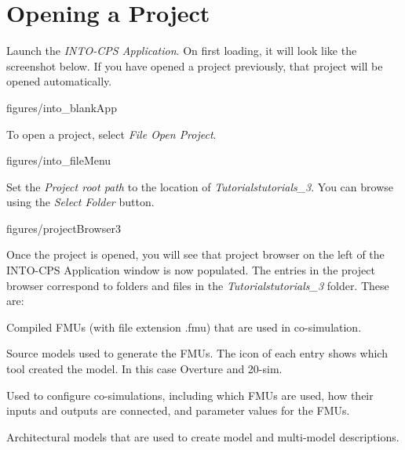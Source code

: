 \documentclass[11pt,a4paper]{../tutorial}
\begin{document}
\section{Opening a Project}
\begin{instructions}
\item Launch the \emph{INTO-CPS Application}. On first loading, it will look like the screenshot below. If you have opened a project previously, that project will be opened automatically.

\begin{annotation}[width=0.85\linewidth,trim=0 150 0 0,clip]{figures/into_blankApp}
    \end{annotation}

\newpage
\item To open a project, select \emph{File \menusep Open Project}.

\begin{annotation}[width=0.85\linewidth,trim=0 260 0 0,clip]{figures/into_fileMenu}
    \end{annotation}

\item Set the \emph{Project root path} to the location of \emph{Tutorials\pathsep{}tutorials\_3}. You can browse using the \emph{Select Folder} button.

\begin{annotation}[width=0.85\linewidth]{figures/projectBrowser3}
\end{annotation}

\newpage
\item Once the project is opened, you will see that project browser on the left of the INTO-CPS Application window is now populated. The entries in the project browser correspond to folders and files in the \emph{Tutorials\pathsep{}tutorials\_3} folder. These are:

    \begin{description}[noitemsep]
        \item[FMUs] Compiled FMUs (with file extension .fmu) that are used in co-simulation.
        \item[Models] Source models used to generate the FMUs. The icon of each entry shows which tool created the model. In this case Overture and 20-sim.
        \item[Multi-models] Used to configure co-simulations, including which FMUs are used, how their inputs and outputs are connected, and parameter values for the FMUs.
        \item[SysML] Architectural models that are used to create model and multi-model descriptions.
    \end{description}


\end{instructions}
\end{document}
